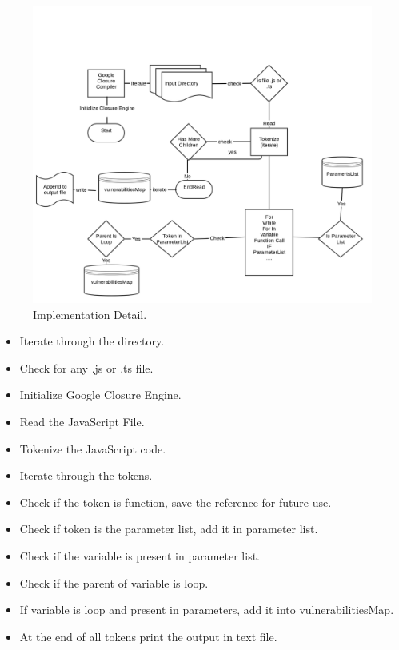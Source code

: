 \documentclass[authoryear,preprint]{sigplanconf}
\begin{document}
\begin{figure}[ht]
\centering
\includegraphics[width=1\linewidth]{figures/workflow}
\caption[Implementation Detail]{\label{f:workflow}Implementation Detail.}
\end{figure}

\begin{itemize}
\item Iterate through the directory.
\item Check for any .js or .ts file.
\item Initialize Google Closure Engine.
\item Read the JavaScript File.
\item Tokenize the JavaScript code.
\item Iterate through the tokens.
\item Check if the token is function, save the reference for future use.
\item Check if token is the parameter list, add it in parameter list.
\item Check if the variable is present in parameter list.
\item Check if the parent of variable is loop.
\item If variable is loop and present in parameters, add it into vulnerabilitiesMap.
\item At the end of all tokens print the output in text file.
\end{itemize}
\end{document}
